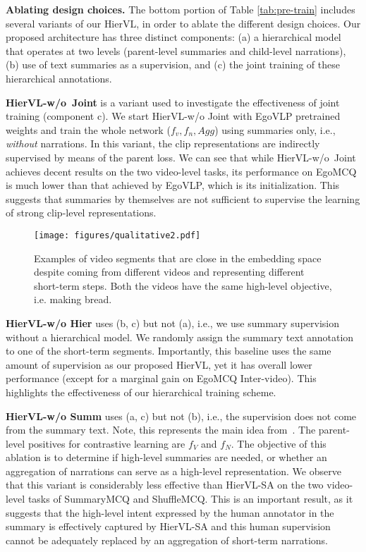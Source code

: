 \documentclass[10pt,twocolumn,letterpaper]{article}
\newcommand{\KAcamera}[1]{{\color{black}{}#1}}
\newcommand{\modelname}[0]{{HierVL}}
\begin{document}
\noindent \textbf{Ablating design choices.} 
The bottom portion of  Table \ref{tab:pre-train} includes several variants of our \modelname, in order to ablate the different design choices. Our proposed architecture has three distinct components: (a) a hierarchical model that operates at two levels (parent-level summaries and child-level narrations), (b) use of text summaries as a supervision, and (c) the joint training of these hierarchical annotations. 

\textbf{\modelname-w/o~Joint} is a variant used to investigate the effectiveness of joint training (component c). We start \modelname-w/o Joint  with EgoVLP pretrained weights and train the whole network ($f_v, f_n, Agg$) using summaries only, i.e., {\em without} narrations. In this variant, the clip representations are indirectly supervised by means of the parent loss. We can see that while \modelname-w/o~Joint achieves decent results on the two video-level tasks, its performance on EgoMCQ is much lower than that achieved by EgoVLP, which is its initialization. This suggests that summaries by themselves are not sufficient to supervise the learning of strong clip-level representations. 

\begin{figure}[t]
\centering
\texttt{[image: figures/qualitative2.pdf]}
\vspace*{-0.12in}
\caption{Examples of video segments that are close in the embedding space despite coming from different videos and representing different short-term steps. Both the videos have the same high-level objective, i.e. making bread.}

\label{fig:qual}
\vspace{-0.10in}
\end{figure}


\textbf{\modelname-w/o Hier} uses (b, c) but not (a), i.e., we use summary supervision without a hierarchical model. We randomly assign the summary text annotation to one of the short-term  segments. Importantly, this baseline uses the same amount of supervision as our proposed \modelname, yet it has overall lower performance (except for a marginal gain on EgoMCQ Inter-video).  This highlights the effectiveness of our hierarchical training scheme. 

\textbf{\modelname-w/o Summ} uses (a, c) but not (b), i.e., the supervision does not come from the summary text. \KAcamera{Note, this represents the main idea from~\cite{cmhse}.}  The parent-level positives for contrastive learning are $f_V$ and $f_N$. The objective of this ablation is to determine if high-level summaries are needed, or whether an aggregation of narrations can serve as a high-level representation. We observe that this variant is considerably less effective than \modelname-SA on the two video-level tasks of SummaryMCQ and ShuffleMCQ. This is an important result, as it suggests that the high-level intent expressed by the human annotator in the summary is effectively captured by \modelname-SA and this human supervision cannot be adequately replaced by an aggregation of short-term narrations. 
\end{document}
